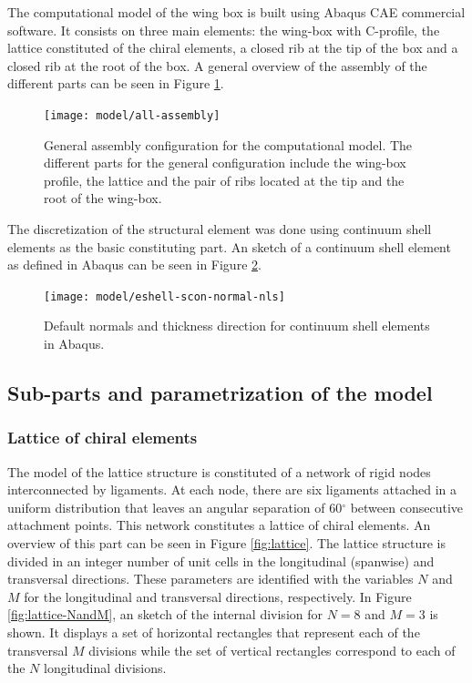   The computational model of the wing box is built using Abaqus CAE commercial software. It consists on three main elements: the wing-box with C-profile, the lattice constituted of the chiral elements, a closed rib at the tip of the box and a closed rib at the root of the box. A general overview of the assembly of the different parts can be seen in Figure \ref{fig:all-assembly}.

  \begin{figure}[!htpb]
    \centering
    \texttt{[image: model/all-assembly]}
    \caption[General assembly configuration for the computational model]{General assembly configuration for the computational model. The different parts for the general configuration include the wing-box profile, the lattice and the pair of ribs located at the tip and the root of the wing-box.}\label{fig:all-assembly}
  \end{figure}

  The discretization of the structural element was done using continuum shell elements as the basic constituting part. An sketch of a continuum shell element as defined in Abaqus can be seen in Figure \ref{fig:shellElement}.

  \begin{figure}[!htpb]
    \centering
    \texttt{[image: model/eshell-scon-normal-nls]}
    \caption[Default normals and thickness direction for continuum shell elements in Abaqus]{Default normals and thickness direction for continuum shell elements in Abaqus. \cite{Abaqus}}\label{fig:shellElement}
  \end{figure}

  \subsection{Sub-parts and parametrization of the model} \label{subsec:parametrization_Model}

    \subsubsection{Lattice of chiral elements} \label{subsubsec:lattice_Parametrization}

    The model of the lattice structure is constituted of a network of rigid nodes interconnected by ligaments. At each node, there are six ligaments attached in a uniform distribution that leaves an angular separation of 60$^{\circ}$ between consecutive attachment points. This network constitutes a lattice of chiral elements. An overview of this part can be seen in Figure \ref{fig:lattice}. The lattice structure is divided in an integer number of unit cells in the longitudinal (spanwise) and transversal directions. These parameters are identified with the variables $N$ and $M$ for the longitudinal and transversal directions, respectively. In Figure \ref{fig:lattice-NandM}, an sketch of the internal division for $N = 8$ and $M = 3$ is shown. It displays a set of horizontal rectangles that represent each of the transversal $M$ divisions while the set of vertical rectangles correspond to each of the $N$ longitudinal divisions.

